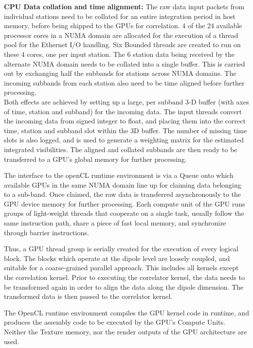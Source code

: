 \documentclass{ws-jai}
\begin{document}
\noindent \textbf  {CPU Data collation and  time alignment:} The raw  data input
packets from individual  stations need to be collated for  an entire integration
period in host memory,  before being shipped to the GPUs  for correlation.  4 of
the  24  available processor  cores  in  a NUMA  domain  are  allocated for  the
execution of a  thread pool for the Ethernet I/O  handling.  Six Bounded threads
are created to run  on these 4 cores, one per input station.  The 6 station data
being received by the  alternate NUMA domain needs to be  collated into a single
buffer. This is carried out by  exchanging half the subbands for stations across
NUMA domains.   The incoming  subbands from  each station also  need to  be time
aligned before further processing.\\

Both effects are  achieved by setting up  a large, per subband  3-D buffer (with
axes of  time, station  and subband)  for the incoming  data. The  input threads
convert the  incoming data from signed  integer to float, and  placing them into
the correct time, station and subband slot  within the 3D buffer.  The number of
missing time slots  is also logged, and  is used to generate  a weighting matrix
for the  estimated integrated visibilities.   The aligned and  collated subbands
are  then  ready  to  be  transferred  to a  GPU's  global  memory  for  further
processing.

The  interface to  the openCL  runtime  environment is  via a  Queue onto  which
available GPUs in the same NUMA domain  line up for claiming data belonging to a
sub-band.  Once claimed,  the raw data is transferred asynchronously  to the GPU
device memory for  further processing. Each compute unit of  the GPU runs groups
of light-weight threads that cooperate on a single task, usually follow the same
instruction path,  share a piece of  fast local memory, and  synchronize through
barrier instructions.

Thus, a GPU thread group is serially  created for the execution of every logical
block.  The  blocks which operate at  the dipole level are  loosely coupled, and
suitable  for a  coarse-grained parallel  approach.  This  includes all  kernels
except the  correlation kernel.  Prior to executing  the correlator  kernel, the
data needs to be  transformed again in order to align the  data along the dipole
dimension. The transformed data is then passed to the correlator kernel.

The OpenCL  runtime environment  compiles the  GPU kernel  code in  runtime, and
produces the  assembly code to be  executed by the GPU's  Compute Units. Neither
the Texture memory, nor the render outputs  of the GPU architecture are used.
\end{document}
